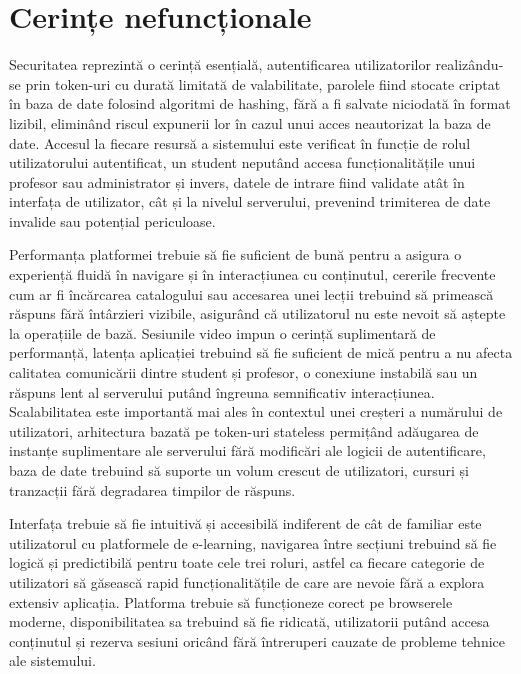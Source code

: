 \section{Cerințe nefuncționale}
Securitatea reprezintă o cerință esențială, autentificarea utilizatorilor realizându-se prin token-uri cu durată limitată de valabilitate, parolele fiind stocate criptat în baza de date folosind algoritmi de hashing, fără a fi salvate niciodată în format lizibil, eliminând riscul expunerii lor în cazul unui acces neautorizat la baza de date. Accesul la fiecare resursă a sistemului este verificat în funcție de rolul utilizatorului autentificat, un student neputând accesa funcționalitățile unui profesor sau administrator și invers, datele de intrare fiind validate atât în interfața de utilizator, cât și la nivelul serverului, prevenind trimiterea de date invalide sau potențial periculoase.

Performanța platformei trebuie să fie suficient de bună pentru a asigura o experiență fluidă în navigare și în interacțiunea cu conținutul, cererile frecvente cum ar fi încărcarea catalogului sau accesarea unei lecții trebuind să primească răspuns fără întârzieri vizibile, asigurând că utilizatorul nu este nevoit să aștepte la operațiile de bază. Sesiunile video impun o cerință suplimentară de performanță, latența aplicației trebuind să fie suficient de mică pentru a nu afecta calitatea comunicării dintre student și profesor, o conexiune instabilă sau un răspuns lent al serverului putând îngreuna semnificativ interacțiunea. Scalabilitatea este importantă mai ales în contextul unei creșteri a numărului de utilizatori, arhitectura bazată pe token-uri stateless permițând adăugarea de instanțe suplimentare ale serverului fără modificări ale logicii de autentificare, baza de date trebuind să suporte un volum crescut de utilizatori, cursuri și tranzacții fără degradarea timpilor de răspuns.

Interfața trebuie să fie intuitivă și accesibilă indiferent de cât de familiar este utilizatorul cu platformele de e-learning, navigarea între secțiuni trebuind să fie logică și predictibilă pentru toate cele trei roluri, astfel ca fiecare categorie de utilizatori să găsească rapid funcționalitățile de care are nevoie fără a explora extensiv aplicația. Platforma trebuie să funcționeze corect pe browserele moderne, disponibilitatea sa trebuind să fie ridicată, utilizatorii putând accesa conținutul și rezerva sesiuni oricând fără întreruperi cauzate de probleme tehnice ale sistemului.

